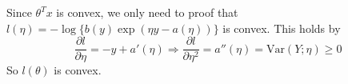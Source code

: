 \begin{answer}
Since $ \theta^Tx $ is convex, we only need to proof that $ l(\eta)=-\log\{b(y)\exp(\eta y -a(\eta))\} $ is convex. This holds by
\[ \frac{\partial l}{\partial \eta}=- y + a'(\eta)\Rightarrow \frac{\partial l}{\partial \eta^2} = a''(\eta) = \mbox{Var}(Y;\eta)\geq 0 \]
So $l(\theta)$ is convex.
\end{answer}
